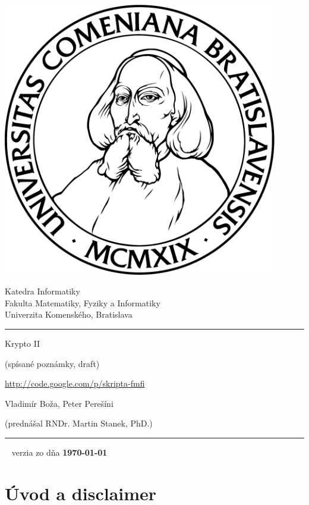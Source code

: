 \documentclass[a4paper]{report}
\begin{document}
\thispagestyle{empty}
\begin{minipage}{0.25\textwidth}
\includegraphics[width=0.9\textwidth]{img/komlogo-new}
\end{minipage}
\begin{minipage}{0.69\textwidth}
\begin{center}
\sc Katedra Informatiky \\
Fakulta Matematiky, Fyziky a Informatiky \\
Univerzita Komenského, Bratislava
\end{center}
\end{minipage}

\def\projecturl{\url{http://code.google.com/p/skripta-fmfi}}

\vfill
\begin{center}
\begin{minipage}{0.8\textwidth}
\hrule
\bigskip\bigskip
\centerline{\LARGE\sc Krypto II}
\smallskip
\centerline{(spísané poznámky, draft)}
\smallskip
\centerline{\projecturl}
\bigskip
\bigskip
\centerline{\large\sc Vladimír Boža, Peter Perešíni}
\bigskip
\centerline{\large\sc (prednášal RNDr. Martin Stanek, PhD.)}
\bigskip\bigskip
\hrule
\end{minipage}
\end{center}
\vfill
{~}
\hfill verzia zo dňa {\bf\today} 
\eject %

\section*{Úvod a disclaimer}
\end{document}

